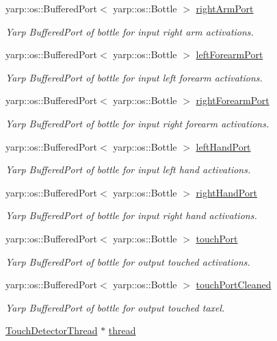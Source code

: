 \begin{DoxyCompactItemize}
yarp\+::os\+::\+Buffered\+Port$<$ yarp\+::os\+::\+Bottle $>$ \hyperlink{group__touchDetector_af16da0a663e6630d242c31219a0f0625}{right\+Arm\+Port}
\begin{DoxyCompactList}\small\item\em Yarp Buffered\+Port of bottle for input right arm activations. \end{DoxyCompactList}\item 
yarp\+::os\+::\+Buffered\+Port$<$ yarp\+::os\+::\+Bottle $>$ \hyperlink{group__touchDetector_a2b47dd0c495d1c6fddf8021c9fa1f2f0}{left\+Forearm\+Port}
\begin{DoxyCompactList}\small\item\em Yarp Buffered\+Port of bottle for input left forearm activations. \end{DoxyCompactList}\item 
yarp\+::os\+::\+Buffered\+Port$<$ yarp\+::os\+::\+Bottle $>$ \hyperlink{group__touchDetector_ac75d232aa9a909bcff0579539662dd2a}{right\+Forearm\+Port}
\begin{DoxyCompactList}\small\item\em Yarp Buffered\+Port of bottle for input right forearm activations. \end{DoxyCompactList}\item 
yarp\+::os\+::\+Buffered\+Port$<$ yarp\+::os\+::\+Bottle $>$ \hyperlink{group__touchDetector_a5ce89302b0d1691947fc15e4ac7ea46f}{left\+Hand\+Port}
\begin{DoxyCompactList}\small\item\em Yarp Buffered\+Port of bottle for input left hand activations. \end{DoxyCompactList}\item 
yarp\+::os\+::\+Buffered\+Port$<$ yarp\+::os\+::\+Bottle $>$ \hyperlink{group__touchDetector_a35c9f995e79e66735b24f79a6c3b4584}{right\+Hand\+Port}
\begin{DoxyCompactList}\small\item\em Yarp Buffered\+Port of bottle for input right hand activations. \end{DoxyCompactList}\item 
yarp\+::os\+::\+Buffered\+Port$<$ yarp\+::os\+::\+Bottle $>$ \hyperlink{group__touchDetector_a190764b1dba056d0f5b5264a1e471746}{touch\+Port}
\begin{DoxyCompactList}\small\item\em Yarp Buffered\+Port of bottle for output touched activations. \end{DoxyCompactList}\item 
yarp\+::os\+::\+Buffered\+Port$<$ yarp\+::os\+::\+Bottle $>$ \hyperlink{group__touchDetector_a6e84947d95f4c06fc49d45794cf73bed}{touch\+Port\+Cleaned}
\begin{DoxyCompactList}\small\item\em Yarp Buffered\+Port of bottle for output touched taxel. \end{DoxyCompactList}\item 
\hyperlink{group__touchDetector_classTouchDetectorThread}{Touch\+Detector\+Thread} $\ast$ \hyperlink{group__touchDetector_aa797aa84cfcb94ea9444877bd7d76ea8}{thread}
\end{DoxyCompactItemize}


